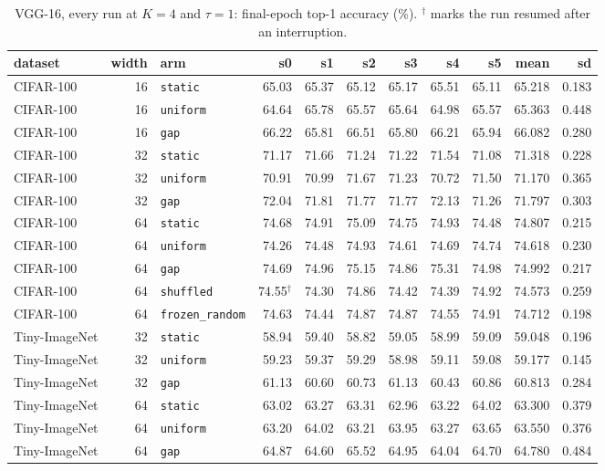 \documentclass[10pt,a4paper]{article}
\begin{document}
\begin{table}[h]\centering\scriptsize
\caption{VGG-16, every run at $K=4$ and $\tau=1$: final-epoch top-1
accuracy (\si{\percent}). $^\dagger$ marks the run resumed after an
interruption.}
\label{tab:vgallruns}
\begin{tabular}{l r l rrrrrr rr}
\toprule
dataset & width & arm & s0 & s1 & s2 & s3 & s4 & s5 & mean & sd \\
\midrule
CIFAR-100 & 16 & \texttt{static} & 65.03 & 65.37 & 65.12 & 65.17 & 65.51 & 65.11 & 65.218 & 0.183 \\
CIFAR-100 & 16 & \texttt{uniform} & 64.64 & 65.78 & 65.57 & 65.64 & 64.98 & 65.57 & 65.363 & 0.448 \\
CIFAR-100 & 16 & \texttt{gap} & 66.22 & 65.81 & 66.51 & 65.80 & 66.21 & 65.94 & 66.082 & 0.280 \\
CIFAR-100 & 32 & \texttt{static} & 71.17 & 71.66 & 71.24 & 71.22 & 71.54 & 71.08 & 71.318 & 0.228 \\
CIFAR-100 & 32 & \texttt{uniform} & 70.91 & 70.99 & 71.67 & 71.23 & 70.72 & 71.50 & 71.170 & 0.365 \\
CIFAR-100 & 32 & \texttt{gap} & 72.04 & 71.81 & 71.77 & 71.77 & 72.13 & 71.26 & 71.797 & 0.303 \\
CIFAR-100 & 64 & \texttt{static} & 74.68 & 74.91 & 75.09 & 74.75 & 74.93 & 74.48 & 74.807 & 0.215 \\
CIFAR-100 & 64 & \texttt{uniform} & 74.26 & 74.48 & 74.93 & 74.61 & 74.69 & 74.74 & 74.618 & 0.230 \\
CIFAR-100 & 64 & \texttt{gap} & 74.69 & 74.96 & 75.15 & 74.86 & 75.31 & 74.98 & 74.992 & 0.217 \\
CIFAR-100 & 64 & \texttt{shuffled} & 74.55$^\dagger$ & 74.30 & 74.86 & 74.42 & 74.39 & 74.92 & 74.573 & 0.259 \\
CIFAR-100 & 64 & \texttt{frozen\_random} & 74.63 & 74.44 & 74.87 & 74.87 & 74.55 & 74.91 & 74.712 & 0.198 \\
Tiny-ImageNet & 32 & \texttt{static} & 58.94 & 59.40 & 58.82 & 59.05 & 58.99 & 59.09 & 59.048 & 0.196 \\
Tiny-ImageNet & 32 & \texttt{uniform} & 59.23 & 59.37 & 59.29 & 58.98 & 59.11 & 59.08 & 59.177 & 0.145 \\
Tiny-ImageNet & 32 & \texttt{gap} & 61.13 & 60.60 & 60.73 & 61.13 & 60.43 & 60.86 & 60.813 & 0.284 \\
Tiny-ImageNet & 64 & \texttt{static} & 63.02 & 63.27 & 63.31 & 62.96 & 63.22 & 64.02 & 63.300 & 0.379 \\
Tiny-ImageNet & 64 & \texttt{uniform} & 63.20 & 64.02 & 63.21 & 63.95 & 63.27 & 63.65 & 63.550 & 0.376 \\
Tiny-ImageNet & 64 & \texttt{gap} & 64.87 & 64.60 & 65.52 & 64.95 & 64.04 & 64.70 & 64.780 & 0.484 \\
\bottomrule
\end{tabular}
\end{table}
\end{document}
